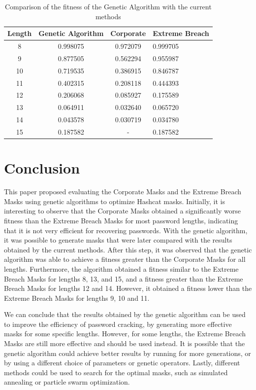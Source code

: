 \documentclass[sigconf,authordraft]{acmart}
\begin{document}
\begin{table}
  \caption{Comparison of the fitness of the Genetic Algorithm with the current methods}
  \label{tab:fitness_comparison}
  \begin{tabular}{cccl}
    \toprule
    Length & Genetic Algorithm & Corporate & Extreme Breach \\
    \midrule
    8 & 0.998075 & 0.972079 & 0.999705 \\
    9 & 0.877505 & 0.562294 & 0.955987 \\
    10 & 0.719535 & 0.386915 & 0.846787 \\
    11 & 0.402315	 & 0.208118 & 0.444393 \\
    12 & 0.206068 & 0.085927 & 0.175589 \\
    13 & 0.064911	 & 0.032640 & 0.065720 \\
    14 & 0.043578	 & 0.030719 & 0.034780 \\
    15 & 0.187582 & - & 0.187582 \\
    \bottomrule
  \end{tabular}
\end{table}

\section{Conclusion}

This paper proposed evaluating the Corporate Masks and the Extreme Breach Masks using genetic algorithms to optimize Hashcat masks.
Initially, it is interesting to observe that the Corporate Masks obtained a significantly worse fitness than the Extreme Breach Masks for most password lengths, indicating that it is not very efficient for recovering passwords.
With the genetic algorithm, it was possible to generate masks that were later compared with the results obtained by the current methods.
After this step, it was observed that the genetic algorithm was able to achieve a fitness greater than the Corporate Masks for all lengths.
Furthermore, the algorithm obtained a fitness similar to the Extreme Breach Masks for lengths 8, 13, and 15, and a fitness greater than the Extreme Breach Masks for lengths 12 and 14.
However, it obtained a fitness lower than the Extreme Breach Masks for lengths 9, 10 and 11.

We can conclude that the results obtained by the genetic algorithm can be used to improve the efficiency of password cracking, by generating more effective masks for some specific lengths.
However, for some lengths, the Extreme Breach Masks are still more effective and should be used instead.
It is possible that the genetic algorithm could achieve better results by running for more generations, or by using a different choice of parameters or genetic operators.
Lastly, different methods could be used to search for the optimal masks, such as simulated annealing or particle swarm optimization.
\end{document}
